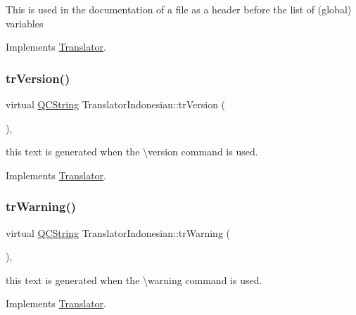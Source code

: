 This is used in the documentation of a file as a header before the list of (global) variables 

Implements \mbox{\hyperlink{class_translator}{Translator}}.

\mbox{\label{class_translator_indonesian_a065aa7fed09b047868c83c26eba73d4c}} 
\subsubsection{\texorpdfstring{trVersion()}{trVersion()}}
{\footnotesize\ttfamily virtual \mbox{\hyperlink{class_q_c_string}{Q\+C\+String}} Translator\+Indonesian\+::tr\+Version (\begin{DoxyParamCaption}{ }\end{DoxyParamCaption})\hspace{0.3cm}{\ttfamily [inline]}, {\ttfamily [virtual]}}

this text is generated when the \textbackslash{}version command is used. 

Implements \mbox{\hyperlink{class_translator}{Translator}}.

\mbox{\label{class_translator_indonesian_a3cd0b54d7865512647081dd7387b1157}} 
\subsubsection{\texorpdfstring{trWarning()}{trWarning()}}
{\footnotesize\ttfamily virtual \mbox{\hyperlink{class_q_c_string}{Q\+C\+String}} Translator\+Indonesian\+::tr\+Warning (\begin{DoxyParamCaption}{ }\end{DoxyParamCaption})\hspace{0.3cm}{\ttfamily [inline]}, {\ttfamily [virtual]}}

this text is generated when the \textbackslash{}warning command is used. 

Implements \mbox{\hyperlink{class_translator}{Translator}}.

\mbox{\label{class_translator_indonesian_a661677e6e6788e79db39c2e7ffe2104e}} 
